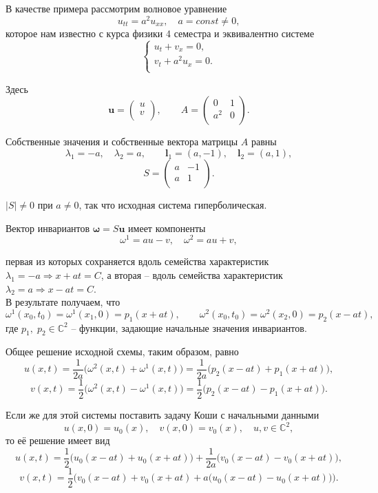 \documentclass{article}
\begin{document}
\begin{example}\label{eq:wave_equation_example}
	В качестве примера рассмотрим волновое уравнение
	\[u_{tt}=a^2u_{xx},\quad a=const\ne 0,\]
	которое нам известно с курса физики 4 семестра и эквивалентно
	системе
	\[\begin{cases}
		u_t+v_x=0, \\
		v_t+a^2u_x=0. \\
	\end{cases}\]

	Здесь
	\[\boldsymbol{u}=
		\begin{pmatrix}
			u \\
			v \\
		\end{pmatrix},
	\qquad
	A=
		\begin{pmatrix}
			0 & 1 \\
			a^2 & 0 \\
		\end{pmatrix}.
	\]

	Собственные значения и собственные вектора матрицы $A$ равны
	\[\lambda_1=-a,\quad \lambda_2=a,\qquad
	\boldsymbol{l}_1=(a,-1),\quad \boldsymbol{l}_2=(a,1),\]
	\[
		S=
		\begin{pmatrix}
			a & -1 \\
			a & 1  \\
		\end{pmatrix}.
	\]

	$|S|\ne 0$ при $a\ne 0$, так что исходная система гиперболическая.

	Вектор инвариантов $\boldsymbol{\omega}=S\boldsymbol{u}$ имеет
	компоненты
	\[\omega^1=au-v,\quad \omega^2=au+v,\]

	первая из которых сохраняется вдоль семейства характеристик
	$\lambda_1=-a\Rightarrow x+at=C$, а вторая -- вдоль семейства
	характеристик $\lambda_2=a\Rightarrow x-at=C$. \\

	
	
	В результате получаем, что
	\[\omega^1(x_0,t_0)=\omega^1(x_1,0)=p_1(x+at),\qquad
	  \omega^2(x_0,t_0)=\omega^2(x_2,0)=p_2(x-at),\]
	где $p_1,\;p_2\in \mathbb C^2$ -- функции, задающие начальные значения
	инвариантов.
	
	Общее решение исходной схемы, таким образом, равно
	\[u(x,t)=\frac{1}{2a}\big(\omega^2(x,t)+\omega^1(x,t)\big)=
	\frac{1}{2a}\big(p_2(x-at)+p_1(x+at)\big),\]
	\[v(x,t)=\frac{1}{2}\big(\omega^2(x,t)-\omega^1(x,t)\big)=
	\frac{1}{2}\big(p_2(x-at)-p_1(x+at)\big).\]
	
	Если же для этой системы поставить задачу Коши с начальными данными
	\[u(x,0)=u_0(x),\quad v(x,0)=v_0(x),\quad u,v\in\mathbb C^2,\]
	то её решение имеет вид
	\[u(x,t)=\frac{1}{2}\big(u_0(x-at)+u_0(x+at)\big)+
	\frac{1}{2a}\big(v_0(x-at)-v_0(x+at)\big),\]
	\[v(x,t)=\frac{1}{2}\Big(v_0(x-at)+v_0(x+at)+
	a\big(u_0(x-at)-u_0(x+at)\big)\Big).\]
\end{example}
\end{document}
